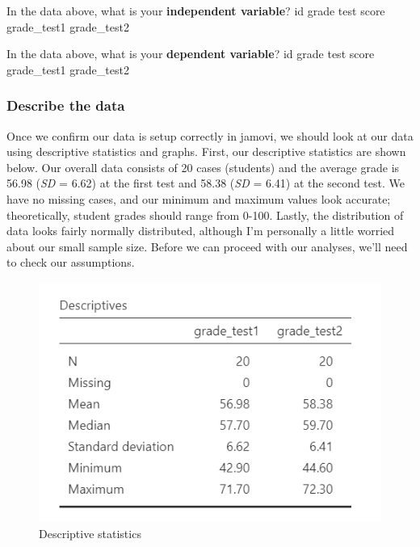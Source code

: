 \documentclass[
]{book}
\begin{document}
In the data above, what is your \textbf{independent variable}? id grade test score grade\_test1 grade\_test2

In the data above, what is your \textbf{dependent variable}? id grade test score grade\_test1 grade\_test2

\hypertarget{describe-the-data-2}{%
\subsubsection{Describe the data}\label{describe-the-data-2}}

Once we confirm our data is setup correctly in jamovi, we should look at our data using descriptive statistics and graphs. First, our descriptive statistics are shown below. Our overall data consists of 20 cases (students) and the average grade is 56.98 (\emph{SD} = 6.62) at the first test and 58.38 (\emph{SD} = 6.41) at the second test. We have no missing cases, and our minimum and maximum values look accurate; theoretically, student grades should range from 0-100. Lastly, the distribution of data looks fairly normally distributed, although I'm personally a little worried about our small sample size. Before we can proceed with our analyses, we'll need to check our assumptions.

\begin{figure}

{\centering \includegraphics[width=0.8\linewidth]{images/03_dependent_t-test/dependent_descriptives} 

}

\caption{Descriptive statistics}\label{fig:unnamed-chunk-2}
\end{figure}
\end{document}
